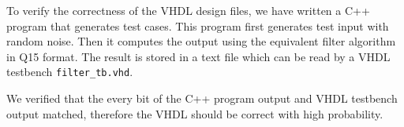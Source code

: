 To verify the correctness of the VHDL design files, we have written a C++ program that generates test cases. This program first generates test input with random noise. Then it computes the output using the equivalent filter algorithm in Q15 format. The result is stored in a text file which can be read by a VHDL testbench \texttt{filter\_tb.vhd}.

We verified that the every bit of the C++ program output and VHDL testbench output matched, therefore the VHDL should be correct with high probability.